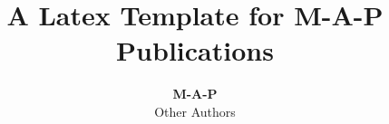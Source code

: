 \documentclass[11pt, a4paper, logo, copyright, nonumbering]{map}
\title{\centering A Latex Template for M-A-P Publications}
\author{
\textbf{M-A-P} \\
Other Authors
}
\begin{document}
\begin{CJK*}{UTF8}{gbsn}

\maketitle


\newpage

\tableofcontents


\newpage










\newpage



\newpage
% 


\end{CJK*}
\end{document}

